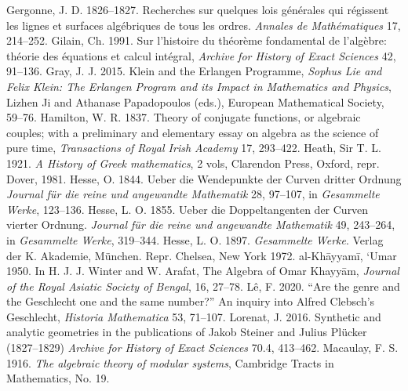 \newline\indent Gergonne, J. D. 1826--1827. Recherches sur quelques lois g\'en\'erales qui r\'egissent les lignes et surfaces alg\'ebriques de tous les ordres. \emph{Annales de Math\'ematiques} 17, 214--252. 
 \newline\indent  Gilain, Ch. 1991. Sur l'histoire du th\'eor\`eme  fondamental de l'alg\`ebre: th\'eorie des \'equations et calcul int\'egral, \emph{Archive for History of Exact Sciences} 42, 91--136. 
\newline\indent  Gray, J. J. 2015. Klein and the Erlangen Programme, \emph{Sophus Lie and Felix Klein: The Erlangen Program and its Impact in Mathematics and Physics}, Lizhen Ji and Athanase Papadopoulos (eds.), European Mathematical Society, 59--76.
 \newline\indent Hamilton, W. R.  1837. Theory of conjugate functions, or algebraic couples; with a preliminary and elementary essay on algebra as the science of pure time, \emph{Transactions of Royal Irish Academy}  17, 293--422. 
 \newline\indent Heath, Sir T. L. 1921. \emph{A History of Greek mathematics}, 2 vols, Clarendon Press, Oxford, repr. Dover, 1981.
 \newline\indent Hesse, O. 1844. Ueber die Wendepunkte der  Curven dritter Ordnung \emph{Journal f{\"u}r die reine und angewandte Mathematik} 28, 97--107, in \emph{Gesammelte Werke}, 123--136.
\newline\indent  Hesse, L. O. 1855. Ueber die Doppeltangenten der Curven vierter Ordnung. \emph{Journal f{\"u}r die reine und angewandte Mathematik} 49, 243--264, in \emph{Gesammelte Werke}, 319--344.
\newline\indent Hesse, L. O. 1897. \emph{Gesammelte Werke}. Verlag der K.  Akademie, M\"{u}nchen. Repr. Chelsea, New York 1972.
\newline\indent al-Kh\={a}yyam\={i}, `Umar 1950. In H. J. J. Winter and W. Arafat, The Algebra of Omar Khayy\={a}m, \emph{Journal of the Royal Asiatic Society of Bengal}, 16, 27--78.
 \newline\indent L\^e, F. 2020. ``Are the genre and the Geschlecht one and the same number?'' An inquiry into Alfred Clebsch's Geschlecht, \emph{Historia Mathematica} 53, 71--107.
 \newline\indent Lorenat, J. 2016. Synthetic and analytic geometries in the publications of Jakob Steiner and Julius Pl\"ucker (1827--1829) \emph{Archive for History of Exact Sciences}  70.4, 413--462.
 \newline\indent Macaulay, F. S.  1916.  \emph{The algebraic theory of modular systems},  Cambridge Tracts in Mathematics, No. 19.
